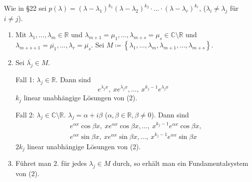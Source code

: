 \documentclass[12pt]{extreport} %
\newcommand{\C}{\mathbb{C}}
\newcommand{\R}{\mathbb{R}}
\theoremstyle{named}
\theoremstyle{nnamed}
\theoremstyle{itshape}
\theoremstyle{normal}
\begin{document}
Wie in \S22 sei $p(\lambda) = \left( \lambda - \lambda_{1} \right)^{k_{1}} \left( \lambda - \lambda_{2} \right)^{k_{2}} \cdot \dotsc \cdot \left( \lambda - \lambda_{r} \right)^{k_{r}}$, ($\lambda_{i} \neq \lambda_{j}$ für $i \neq j$).
\begin{enumerate}[label=\arabic*.]
	\item Mit $\lambda_{1}, \dotsc, \lambda_{m} \in \R$ und $\lambda_{m+1} = \mu_{1} , \dotsc, \lambda_{m+s} = \mu_{s} \in \C \setminus \R$ und $\lambda_{m+s+1} = \overline{\mu_{1}}, \dotsc, \lambda_{r} = \overline{\mu_{s}}$. Sei $M \coloneqq \left\{ \lambda_{1}, \dotsc, \lambda_{m}, \lambda_{m+1}, \dotsc, \lambda_{m+s} \right\}$. 
	\item Sei $\overline{\lambda_{j}} \in M$. 
	
		\bigskip
		
		Fall 1: $\lambda_{j} \in \R$. Dann sind
		 	$$ e^{\lambda_{j} x}, ~x e^{\lambda_{j} x}, \dotsc, ~x^{k_{j} - 1} e^{\lambda_{j} x} $$
		$k_{j}$ linear unabhängige Lösungen von (2).
		 	
		\bigskip
		 	
		Fall 2: $\lambda_{j} \in \C \setminus \R$. $\lambda_{j} = \alpha + i \beta$ ($\alpha, \beta \in \R, \beta \neq 0$). Dann sind
		\begin{align*}
			& e^{\alpha x} \cos \beta x, ~ x e^{\alpha x} \cos \beta x,  \dotsc, ~x^{k_{j} - 1} e^{\alpha x} \cos \beta x, \\
			& e^{\alpha x} \sin \beta x, ~ x e^{\alpha x} \sin \beta x,  \dotsc, ~x^{k_{j} - 1} e^{\alpha x} \sin \beta x
		\end{align*}
		$2k_{j}$ linear unabhängige Lösungen von (2).
	\item Führet man 2. für jedes $\lambda_{j} \in M$ durch, so erhält man ein Fundamentalsystem von (2).
\end{enumerate}
\end{document}
